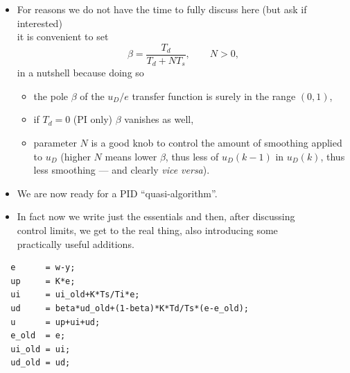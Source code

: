 \begin{frame}
\framesubtitleTC{}
\myPause
 \begin{itemize}[<+-| alert@+>]
 \item For reasons we do not have the time to fully discuss here (but ask if interested)\\
       it is convenient to set
       \begin{displaymath}
        \beta = \frac{T_d}{T_d+NT_s}, \qquad N>0,
       \end{displaymath}
       in a nutshell because doing so
       \begin{itemize}[<+-| alert@+>]
       \item the pole $\beta$ of the $u_D/e$ transfer function is surely in the range $(0,1)$,
       \item if $T_d=0$ (PI only) $\beta$ vanishes as well,
       \item parameter $N$ is a good knob to control the amount of smoothing applied\\
             to $u_D$ (higher $N$ means lower $\beta$, thus less of $u_D(k-1)$ in $u_D(k)$, thus\\
             less smoothing --- and clearly \textit{vice versa}). 
       \end{itemize}
 \item We are now ready for a PID ``quasi-algorithm''.
 \item In fact now we write just the essentials and then, after discussing\\
       control limits, we get to the real thing, also introducing some\\
       practically useful additions.
 \end{itemize}
\end{frame}

\begin{frame}[fragile,label={pag:PID-quasi-alg}]
\myPause
 \begin{verbatim}
  e      = w-y;
  up     = K*e;
  ui     = ui_old+K*Ts/Ti*e;
  ud     = beta*ud_old+(1-beta)*K*Td/Ts*(e-e_old);
  u      = up+ui+ud;
  e_old  = e;
  ui_old = ui;
  ud_old = ud;
 \end{verbatim}
\end{frame}

